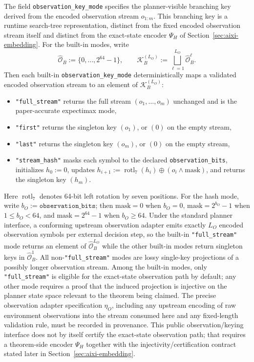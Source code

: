 \documentclass[11pt]{article}
\begin{document}
The field \texttt{observation\_key\_mode} specifies the planner-visible
branching key derived from the encoded observation stream $o_{1:m}$. This
branching key is a runtime search-tree representation, distinct from the fixed
encoded observation stream itself and distinct from the exact-state encoder
$\Psi_H$ of Section~\ref{sec:aixi-embedding}. For the built-in modes, write
\[
\widehat{\mathcal O}_B:=\{0,\dots,2^{64}-1\},
\qquad
\mathcal{K}_B^{(L_O)}:=\bigsqcup_{\ell=1}^{L_O}\widehat{\mathcal O}_B^\ell.
\]
Then each built-in \texttt{observation\_key\_mode} deterministically maps a
validated encoded observation stream to an element of
$\mathcal{K}_B^{(L_O)}$:
\begin{itemize}
    \item \texttt{"full\_stream"} returns the full stream
    $(o_1,\dots,o_m)$ unchanged and is the paper-accurate expectimax mode,
    \item \texttt{"first"} returns the singleton key $(o_1)$, or $(0)$ on the
    empty stream,
    \item \texttt{"last"} returns the singleton key $(o_m)$, or $(0)$ on the
    empty stream,
    \item \texttt{"stream\_hash"} masks each symbol to the declared
    \texttt{observation\_bits}, initializes $h_0:=0$, updates
    $h_{i+1}:=\operatorname{rotl}_7(h_i)\oplus(o_i\wedge \mathrm{mask})$, and
    returns the singleton key $(h_m)$.
\end{itemize}
Here $\operatorname{rotl}_7$ denotes 64-bit left rotation by seven positions.
For the hash mode, write $b_O:=\texttt{observation\_bits}$; then
$\mathrm{mask}=0$ when $b_O=0$, $\mathrm{mask}=2^{b_O}-1$ when
$1\le b_O<64$, and $\mathrm{mask}=2^{64}-1$ when $b_O\ge 64$.
Under the standard planner interface, a conforming upstream observation adapter
emits exactly $L_O$ encoded observation symbols per external decision step, so
the built-in \texttt{"full\_stream"} mode returns an element of
$\widehat{\mathcal O}_B^{L_O}$ while the other built-in modes return singleton
keys in $\widehat{\mathcal O}_B^1$. All non-\texttt{"full\_stream"} modes are
lossy single-key projections of a possibly longer observation stream. Among the
built-in modes, only \texttt{"full\_stream"} is eligible for the exact-state
observation path by default; any other mode requires a proof that the induced
projection is injective on the planner state space relevant to the theorem
being claimed. The precise observation adapter specification $\eta_O$,
including any upstream encoding of raw environment observations into the stream
consumed here and any fixed-length validation rule, must be recorded in
provenance. This public observation/keying interface does not by itself
certify the exact-state observation path; that requires a theorem-side
encoder $\Psi_H$ together with the injectivity/certification contract stated
later in Section~\ref{sec:aixi-embedding}.
\end{document}

